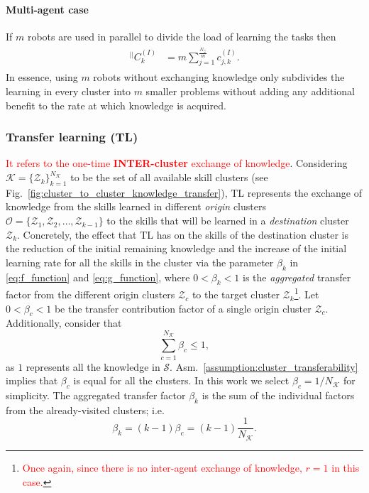 \paragraph*{Multi-agent case}
If $m$ robots are used in parallel to divide the load of learning the tasks then
\begin{align}
	\begin{split}
		{}^{\lvert \rvert}C^{(I)}_k &= m\sum^{\frac{N_{\mathcal{Z}}}{m}}_{j=1} c^{(I)}_{j,k}.
	\end{split}
\end{align}
In essence, using $m$ robots without exchanging knowledge only subdivides the learning in every cluster into $m$ smaller problems without adding any additional benefit to the rate at which knowledge is acquired. 

\subsubsection{\textbf{Transfer learning (TL)}}
\textcolor{red}{It refers to the one-time \textbf{INTER-cluster} exchange of knowledge}. Considering $\mathcal{K} = \{ \mathcal{Z}_k \}^{N_\mathcal{K}}_{k=1}$ to be the set of all available skill clusters (see Fig.~\ref{fig:cluster_to_cluster_knowledge_transfer}), TL represents the exchange of knowledge from the skills learned in different \emph{origin} clusters $\mathcal{O} = \{ \mathcal{Z}_1,\mathcal{Z}_2,\ldots,\mathcal{Z}_{k-1} \}$ to the skills that will be learned in a \emph{destination} cluster $\mathcal{Z}_k$. Concretely, the effect that TL has on the skills of the destination cluster is the reduction of the initial remaining knowledge and the increase of the initial learning rate for all the skills in the cluster via the parameter $\beta_k$ in \eqref{eq:f_function} and \eqref{eq:g_function}, where $0<\beta_{k} < 1$ is the \emph{aggregated} transfer factor from the different origin clusters $\mathcal{Z}_{c}$ to the target cluster $\mathcal{Z}_{k}$\footnote{\textcolor{red}{Once again, since there is no inter-agent exchange of knowledge, $ r = 1 $ in this case.}}. Let $0<\beta_{c} < 1$ be the transfer contribution factor of a single origin cluster $\mathcal{Z}_c$. Additionally, consider that
\begin{equation}
	\sum\limits_{c=1}^{N_\mathcal{K}}\beta_{c} \leq 1,
\end{equation}
as $1$ represents all the knowledge in $\mathcal{S}$. Asm.~\ref{assumption:cluster_transferability} implies that $\beta_c$ is equal for all the clusters. In this work we select $\beta_c = 1/N_\mathcal{K}$ for simplicity. The aggregated transfer factor $\beta_k$ is the sum of the individual factors from the already-visited clusters; i.e.
\begin{equation}
	\beta_{k}= \left(k-1\right)\beta_c = \left(k-1\right)\frac{1}{N_\mathcal{K}}.
\end{equation}


